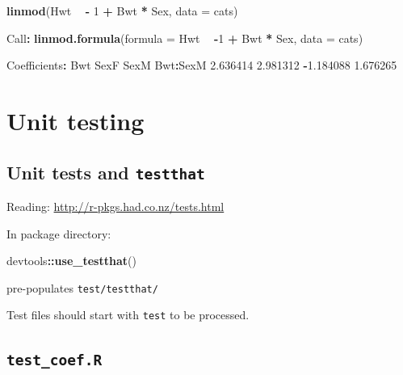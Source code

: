 \documentclass[]{book}
\newenvironment{Shaded}{\begin{snugshade}}{\end{snugshade}}
\newcommand{\KeywordTok}[1]{\textcolor[rgb]{0.13,0.29,0.53}{\textbf{#1}}}
\newcommand{\DataTypeTok}[1]{\textcolor[rgb]{0.13,0.29,0.53}{#1}}
\newcommand{\DecValTok}[1]{\textcolor[rgb]{0.00,0.00,0.81}{#1}}
\newcommand{\FloatTok}[1]{\textcolor[rgb]{0.00,0.00,0.81}{#1}}
\newcommand{\StringTok}[1]{\textcolor[rgb]{0.31,0.60,0.02}{#1}}
\newcommand{\OperatorTok}[1]{\textcolor[rgb]{0.81,0.36,0.00}{\textbf{#1}}}
\newcommand{\NormalTok}[1]{#1}
\theoremstyle{definition}
\theoremstyle{definition}
\theoremstyle{definition}
\theoremstyle{remark}
\begin{document}
\begin{Shaded}
\begin{Highlighting}[]
\KeywordTok{linmod}\NormalTok{(Hwt }\OperatorTok{~}\StringTok{ }\OperatorTok{-}\StringTok{ }\DecValTok{1} \OperatorTok{+}\StringTok{ }\NormalTok{Bwt }\OperatorTok{*}\StringTok{ }\NormalTok{Sex, }\DataTypeTok{data =}\NormalTok{ cats)}
\end{Highlighting}
\end{Shaded}

\begin{Shaded}
\begin{Highlighting}[]
\NormalTok{Call}\OperatorTok{:}
\KeywordTok{linmod.formula}\NormalTok{(}\DataTypeTok{formula =}\NormalTok{ Hwt }\OperatorTok{~}\StringTok{ }\OperatorTok{-}\DecValTok{1} \OperatorTok{+}\StringTok{ }\NormalTok{Bwt }\OperatorTok{*}\StringTok{ }\NormalTok{Sex, }\DataTypeTok{data =}\NormalTok{ cats)}

\NormalTok{Coefficients}\OperatorTok{:}
\StringTok{      }\NormalTok{Bwt      SexF      SexM  Bwt}\OperatorTok{:}\NormalTok{SexM }
 \FloatTok{2.636414}  \FloatTok{2.981312} \OperatorTok{-}\FloatTok{1.184088}  \FloatTok{1.676265} 
\end{Highlighting}
\end{Shaded}

\section{Unit testing}\label{unit-testing}

\subsection{\texorpdfstring{Unit tests and
\texttt{testthat}}{Unit tests and testthat}}\label{unit-tests-and-testthat}

Reading: \url{http://r-pkgs.had.co.nz/tests.html}

In package directory:

\begin{Shaded}
\begin{Highlighting}[]
\NormalTok{devtools}\OperatorTok{::}\KeywordTok{use_testthat}\NormalTok{()}
\end{Highlighting}
\end{Shaded}

pre-populates \texttt{test/testthat/}

Test files should start with \texttt{test} to be processed.

\subsection{\texorpdfstring{\texttt{test\_coef.R}}{test\_coef.R}}\label{test_coef.r}
\end{document}
